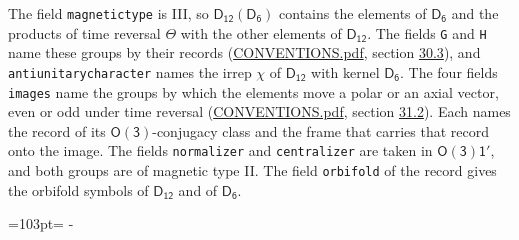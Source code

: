 \documentclass[10pt,a4paper]{article}
\newcommand{\needspace}[1]{\par\penalty-100\begingroup\dimen0=#1\relax\dimen2=\pagegoal
  \advance\dimen2-\pagetotal\ifdim\dimen0>\dimen2\relax\ifdim\dimen2>0pt\vfil\break\fi\fi
  \endgroup}
\numberwithin{equation}{section}
\newcommand{\grp}[1]{\mathsf{#1}}
\begin{document}
The field \texttt{magnetictype} is III, so $\grp{D_{12}}(\grp{D_{6}})$ contains the elements of $\grp{D_{6}}$ and the products of time reversal $\varTheta$ with the other elements of $\grp{D_{12}}$. The fields \texttt{G} and \texttt{H} name these groups by their records (\href{../../CONVENTIONS.pdf}{CONVENTIONS.pdf}, section \href{../../CONVENTIONS.pdf\#conv.30.3}{30.3}), and \texttt{antiunitarycharacter} names the irrep $\chi$ of $\grp{D_{12}}$ with kernel $\grp{D_{6}}$. The four fields \texttt{images} name the groups by which the elements move a polar or an axial vector, even or odd under time reversal (\href{../../CONVENTIONS.pdf}{CONVENTIONS.pdf}, section \href{../../CONVENTIONS.pdf\#conv.31.2}{31.2}). Each names the record of its $\grp{O(3)}$-conjugacy class and the frame that carries that record onto the image. The fields \texttt{normalizer} and \texttt{centralizer} are taken in $\grp{O(3)1'}$, and both groups are of magnetic type II. The field \texttt{orbifold} of the record gives the orbifold symbols of $\grp{D_{12}}$ and of $\grp{D_{6}}$.
\needspace{103pt}
\end{document}

